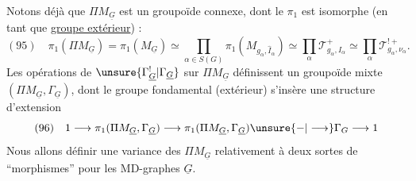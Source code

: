 Notons déjà que $\Pi M_{\underline G}$ est un groupoïde
connexe, dont le $\pi_1$ est isomorphe (en tant que \uline{groupe extérieur}) :
\[
(95)\quad\pi_1(\Pi M_{\underline G})=\pi_1(M_{\underline G})\simeq\prod_{\alpha\in S(G)}\pi_1(M_{g_\alpha,\widehat I_\alpha})\simeq\prod_\alpha\mathcal T^+_{g_\alpha,I_\alpha}\simeq\prod_\alpha\mathcal T^{!+}_{g_\alpha,\nu_\alpha}.
\]
Les opérations de $\unsure{\Gamma^{!}_{\underline G}|\Gamma_{\underline G}}$ sur $\Pi M_{\underline G}$ définissent un groupoïde mixte $(\Pi M_{\underline G},\Gamma_{\underline G})$, dont le groupe fondamental (extérieur) s'insère   une structure d'extension
\[
(96)\quad1\longrightarrow\pi_1(\Pi M_{\underline G},\Gamma_{\underline G})\longrightarrow\pi_1(\Pi M_{\underline G},\Gamma_{\underline G})\unsure{-|\longrightarrow}\Gamma_G\longrightarrow1
\]
Nous allons définir une  variance des $\Pi M_{\underline G}$ relativement à deux sortes de ``morphismes'' pour les MD-graphes $\underline G$. 

